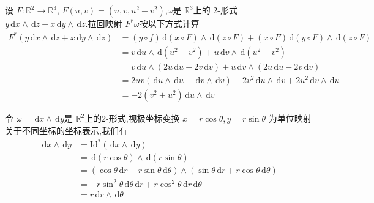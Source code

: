 \documentclass[../../几何与拓扑.tex]{subfiles}
\begin{document}
\begin{example}
    设 $ F: \mathbb{R} ^{2}\to \mathbb{R} ^{3} $, $ F\left( u,v \right)= \left( u,v,u^{2}-v^{2} \right)   $,$ \omega  $是 $ \mathbb{R} ^{3} $上的 2-形式 $ y\,\mathrm{d} x\wedge \,\mathrm{d} z+ x\,\mathrm{d} y\wedge \,\mathrm{d} z $.拉回映射 $ F^{*}\omega  $按以下方式计算 $$
    \begin{aligned}
    F^{*}\left( y \,\mathrm{d} x\wedge \,\mathrm{d} z+ x\,\mathrm{d} y\wedge \,\mathrm{d} z \right)& = \left( y\circ f \right)\,\mathrm{d} \left( x\circ F \right)\wedge \,\mathrm{d} \left( z\circ F \right)+  \left( x\circ F \right)\,\mathrm{d} \left( y\circ F \right)\wedge \,\mathrm{d} \left( z\circ F \right)\\ 
     & = v \,\mathrm{d} u \wedge  \,\mathrm{d} \left( u^{2}-v^{2} \right)+  u \,\mathrm{d} v\wedge \,\mathrm{d} \left( u^{2}-v^{2} \right)\\ 
    & =  v \,\mathrm{d} u   \wedge \left( 2u\,\mathrm{d} u-2v\,\mathrm{d} v \right)+  u \,\mathrm{d} v\wedge \left( 2u\,\mathrm{d} u-2v\,\mathrm{d} v \right)\\ 
    &= 2uv \left( \,\mathrm{d} u\wedge \,\mathrm{d} u-\,\mathrm{d} v\wedge \,\mathrm{d} v \right)- 2v^{2} \,\mathrm{d} u\wedge \,\mathrm{d} v+  2u^{2}\,\mathrm{d} v\wedge \,\mathrm{d} u\\ 
     & = -2\left( v^{2}+ u^{2} \right)\,\mathrm{d} u\wedge \,\mathrm{d} v   
    \end{aligned}
    $$     
\end{example}

\begin{example}
    令 $ \omega = \,\mathrm{d} x\wedge \,\mathrm{d} y $是 $ \mathbb{R} ^{2} $上的2-形式,视极坐标变换 $ x = r\cos \theta ,y= r\sin \theta  $ 为单位映射关于不同坐标的坐标表示,我们有 $$
    \begin{aligned}
    \,\mathrm{d} x\wedge \,\mathrm{d} y& = \mathrm{Id}^{*}\left( \,\mathrm{d} x\wedge \,\mathrm{d} y \right)\\ 
     & = \,\mathrm{d} \left( r\cos \theta  \right)\wedge \,\mathrm{d} \left( r\sin \theta  \right)    \\ 
      & = \left( \cos \theta \,\mathrm{d} r- r\sin \theta  \,\mathrm{d} \theta  \right)\wedge \left(  \sin \theta \,\mathrm{d} r+  r\cos \theta \,\mathrm{d} \theta  \right)\\ 
       & = -r\sin^{2} \theta \,\mathrm{d} \theta \,\mathrm{d} r+ r\cos ^{2}\theta  \,\mathrm{d} r\,\mathrm{d} \theta \\ 
        & =   r \,\mathrm{d} r\wedge \,\mathrm{d}\theta 
    \end{aligned}
    $$
\end{example}
\end{document}
